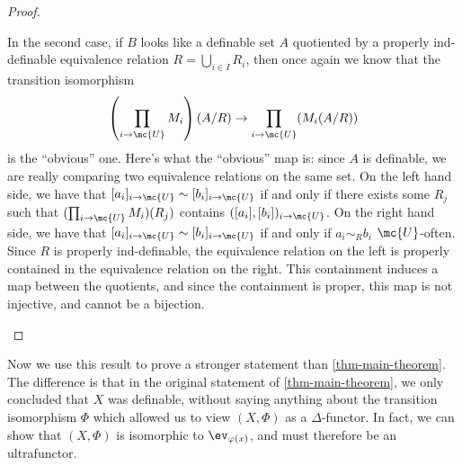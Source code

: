 \begin{proof}
\begin{description}
      In the second case, if $B$ looks like a definable set $A$ quotiented by a properly ind-definable equivalence relation $R = \bigcup_{i \in I} R_i$, then once again we know that the transition isomorphism
      $$
\left(\prod_{i \to \mc{U}}M_i\right) \left(A/R\right) \to \prod_{i \to \mc{U}}(M_i(A/R))
$$
is the ``obvious'' one. Here's what the ``obvious'' map is: since $A$ is definable, we are really comparing two equivalence relations on the same set. On the left hand side, we have that $[a_i]_{i \to \mc{U}} \sim [b_i]_{i \to \mc{U}}$ if and only if there exists some $R_j$ such that $(\prod_{i \to \mc{U}}M_i)(R_j)$ contains $([a_i], [b_i])_{i \to \mc{U}}$. On the right hand side, we have that $[a_i]_{i \to \mc{U}} \sim [b_i]_{i \to \mc{U}}$ if and only if $a_i \sim_R b_i$ $\mc{U}$-often. Since $R$ is properly ind-definable, the equivalence relation on the left is properly contained in the equivalence relation on the right. This containment induces a map between the quotients, and since the containment is proper, this map is not injective, and cannot be a bijection.
      \end{description}

    \end{proof}
  
  Now we use this result to prove a stronger statement than \ref{thm-main-theorem}. The difference is that in the original statement of \ref{thm-main-theorem}, we only concluded that $X$ was definable, without saying anything about the transition isomorphism $\Phi$ which allowed us to view $(X, \Phi)$ as a $\Delta$-functor. In fact, we can show that $(X,\Phi)$ is isomorphic to $\ev_{\varphi(x)}$, and must therefore be an ultrafunctor.


  
  
